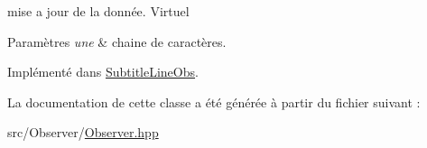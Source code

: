 mise a jour de la donnée. Virtuel 


\begin{DoxyParams}{Paramètres}
{\em une} & chaine de caractères. \\
\hline
\end{DoxyParams}


Implémenté dans \hyperlink{classSubtitleLineObs_a5aab5a727bb01f5d8adc5d31a7521b13}{Subtitle\+Line\+Obs}.



La documentation de cette classe a été générée à partir du fichier suivant \+:\begin{DoxyCompactItemize}
\item 
src/\+Observer/\hyperlink{Observer_8hpp}{Observer.\+hpp}\end{DoxyCompactItemize}
